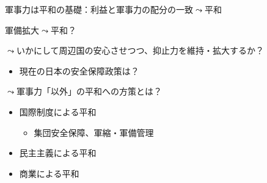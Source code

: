 \documentclass[
  xelatex,
  ja=standard]{bxjsarticle}
\providecommand{\tightlist}{%
  \setlength{\itemsep}{0pt}\setlength{\parskip}{0pt}}\usepackage{longtable,booktabs,array}
\begin{document}
軍事力は平和の基礎：利益と軍事力の配分の一致\(\leadsto\)平和

軍備拡大\(\leadsto\)平和？

\(\leadsto\)いかにして周辺国の安心させつつ、抑止力を維持・拡大するか？

\begin{itemize}
\tightlist
\item
  現在の日本の安全保障政策は？
\end{itemize}

\(\leadsto\)軍事力「以外」の平和への方策とは？

\begin{itemize}
\tightlist
\item
  国際制度による平和

  \begin{itemize}
  \tightlist
  \item
    集団安全保障、軍縮・軍備管理
  \end{itemize}
\item
  民主主義による平和
\item
  商業による平和
\end{itemize}


  
\end{document}
